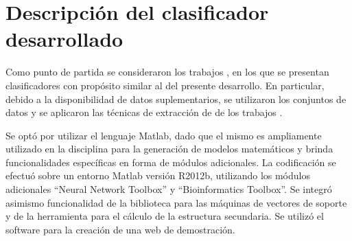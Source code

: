 %
%
%
%
\setcounter{chapter}{2}
%
\chapter{Descripción del clasificador desarrollado}
%
%
Como punto de partida se consideraron los trabajos
\cite{xue,ng,batuwita,sheng,sewer,ding}, en los que se presentan
clasificadores con propósito similar al del presente desarrollo.
En particular, debido a la disponibilidad de datos suplementarios, se
utilizaron los conjuntos de datos y se aplicaron las técnicas de
extracción de  de los trabajos \cite{xue,ng,batuwita}.

Se optó por utilizar el lenguaje Matlab, dado que el mismo es
ampliamente utilizado en la disciplina para la generación de modelos
matemáticos y brinda funcionalidades específicas en forma de módulos
adicionales.
La codificación se efectuó sobre un entorno Matlab versión R2012b,
utilizando los módulos adicionales ``Neural Network Toolbox'' y
``Bioinformatics Toolbox''.
Se integró asimismo funcionalidad de la biblioteca 
\cite{libsvm} para las máquinas de vectores de soporte y de la
herramienta  \cite{vienna} para el cálculo de la
estructura secundaria.
Se utilizó el software \work\webdemo{} \cite{webdemobuilder} para
la creación de una web de demostración.
